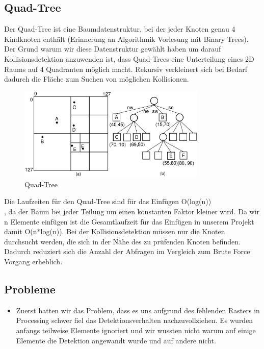 \documentclass[12pt,a4paper]{article}
\begin{document}
	

	\subsection{Quad-Tree}
	Der Quad-Tree ist eine Baumdatenstruktur, bei der jeder Knoten genau 4 Kindknoten enthält (Erinnerung an Algorithmik Vorlesung mit Binary Trees). Der Grund warum wir diese Datenstruktur gewählt haben um darauf Kollisionsdetektion anzuwenden ist, dass Quad-Trees eine Unterteilung eines 2D Raums auf 4 Quadranten möglich macht. Rekursiv verkleinert sich bei Bedarf dadurch die Fläche zum Suchen von möglichen Kollisionen.
	\begin{figure}[H]
		\centering 
		\includegraphics[width=0.8\textwidth]{quadtree.png}  
		\caption{Quad-Tree  \cite{quadtree_example}} 
		\label{Bild: Beispiel Quadtree}  
	\end{figure}
	Die Laufzeiten für den Quad-Tree sind für das Einfügen O(log(n)) \cite{quadtree_source}~ \\, da der Baum bei jeder Teilung um einen konstanten Faktor kleiner wird. Da wir n Elemente einfügen ist die Gesamtlaufzeit für das Einfügen in unserem Projekt damit O(n*log(n)). 
	Bei der Kollisionsdetektion müssen nur die Knoten durchsucht werden, die sich in der Nähe des zu prüfenden Knoten befinden. Dadurch reduziert sich die Anzahl der Abfragen im Vergleich zum Brute Force Vorgang erheblich.
	\subsection{Probleme}
	\begin{itemize}
		\item
		Zuerst hatten wir das Problem, dass es uns aufgrund des fehlenden Rasters in Processing schwer fiel das Detektionsverhalten nachzuvollziehen. Es wurden anfangs teilweise Elemente ignoriert und wir wussten nicht warum auf einige Elemente die Detektion angewandt wurde und auf andere nicht.
	\end{itemize}
\end{document}

